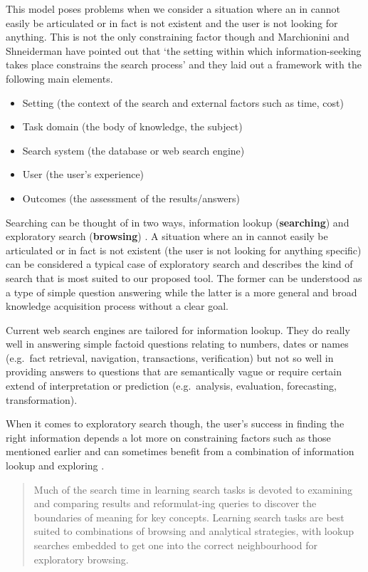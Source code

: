 This model poses problems when we consider a situation where an \ac{in} cannot easily be articulated or in fact is not existent and the user is not looking for anything. This is not the only constraining factor though and Marchionini and Shneiderman have pointed out that `the setting within which information-seeking takes place constrains the search process' \autocite{Marchionini1988} and they laid out a framework with the following main elements.

\begin{itemize}
  \item Setting (the context of the search and external factors such as time, cost)
  \item Task domain (the body of knowledge, the subject)
  \item Search system (the database or web search engine)
  \item User (the user’s experience)
  \item Outcomes (the assessment of the results/answers)
\end{itemize}

Searching can be thought of in two ways, information lookup (\textbf{searching}) and exploratory search (\textbf{browsing}) \autocite{DeVries1993, Marchionini2006}. A situation where an \ac{in} cannot easily be articulated or in fact is not existent (the user is not looking for anything specific) can be considered a typical case of exploratory search and describes the kind of search that is most suited to our proposed tool. The former can be understood as a type of simple question answering while the latter is a more general and broad knowledge acquisition process without a clear goal.

Current web search engines are tailored for information lookup. They do really well in answering simple factoid questions relating to numbers, dates or names (e.g.\ fact retrieval, navigation, transactions, verification) but not so well in providing answers to questions that are semantically vague or require certain extend of interpretation or prediction (e.g.\ analysis, evaluation, forecasting, transformation).

When it comes to exploratory search though, the user’s success in finding the right information depends a lot more on constraining factors such as those mentioned earlier and can sometimes benefit from a combination of information lookup and exploring \autocite{Marchionini2006}.

\begin{quotation}
  Much of the search time in learning search tasks is devoted to examining and comparing results and reformulat-ing queries to discover the boundaries of meaning for key concepts. Learning search tasks are best suited to combinations of browsing and analytical strategies, with lookup searches embedded to get one into the correct neighbourhood for exploratory browsing. 
\end{quotation}

